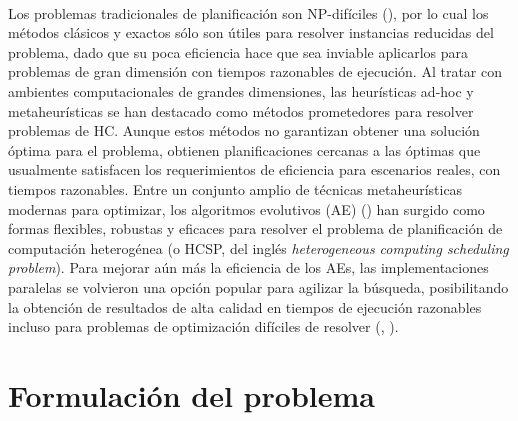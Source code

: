 \paragraph{}Los problemas tradicionales de planificación son NP-difíciles (\citet{bib-garey}), por lo cual los métodos clásicos y exactos sólo son útiles para resolver instancias reducidas del problema, dado que su poca eficiencia hace que sea inviable aplicarlos para problemas de gran dimensión con tiempos razonables de ejecución. Al tratar con ambientes computacionales de grandes dimensiones, las heurísticas ad-hoc y metaheurísticas se han destacado como métodos prometedores para resolver problemas de HC. Aunque estos métodos no garantizan obtener una solución óptima para el problema, obtienen planificaciones cercanas a las óptimas que usualmente satisfacen los requerimientos de eficiencia para escenarios reales, con tiempos razonables.
Entre un conjunto amplio de técnicas metaheurísticas modernas para optimizar, los algoritmos evolutivos (AE) (\citet{bib-back-handbook}) han surgido como formas flexibles, robustas y eficaces para resolver el problema de planificación de computación heterogénea (o HCSP, del inglés \textit{heterogeneous computing scheduling problem}). Para mejorar aún más la eficiencia de los AEs, las implementaciones paralelas se volvieron una opción popular para agilizar la búsqueda, posibilitando la obtención de resultados de alta calidad en tiempos de ejecución razonables incluso para problemas de optimización difíciles de resolver (\citet{bib-cantu-genetic-algorithms}, \citet{bib-alba-genetic-algorithms}).

\section{Formulación del problema} \label{section:descripcion-problema,subsection:formulacion-problema}

